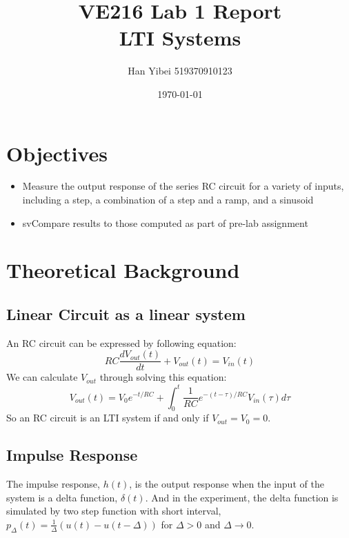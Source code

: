 \documentclass[a4paper]{article}
\title{\textbf{VE216 Lab 1 Report\\LTI Systems}}
\author{
    \Large Han Yibei
    \normalsize 519370910123
}
\date{\today}
\begin{document}
    \maketitle
    \tableofcontents
    \newpage




    \section{Objectives}
    \begin{itemize}
        \item Measure the output response of the series RC circuit for a variety of inputs, including a step, a
        combination of a step and a ramp, and a sinusoid
        \item svCompare results to those computed as part of pre-lab assignment
    \end{itemize}






    \section{Theoretical Background}
    \subsection{Linear Circuit as a linear system}
    An RC circuit can be expressed by following equation:
    \begin{equation}
        RC\frac{dV_{out}(t)}{dt} + V_{out}(t) = V_{in}(t)    
    \end{equation}
    We can calculate $V_{out}$ through solving this equation:
    \begin{equation}
        V_{out}(t) = V_0e^{-t/RC} + \int_0^t \frac{1}{RC}e^{-(t-\tau)/RC}V_{in}(\tau)d\tau
    \end{equation}
   So an RC circuit is an LTI system if and only if $V_{out}=V_0=0$. 

    \subsection{Impulse Response}
    The impulse response, $h(t)$, is the output response when the input of the system is a delta function, $\delta(t)$. And in the experiment, the delta function is simulated by two step function with short interval, $p_\Delta(t) = \frac{1}{\Delta}(u(t)-u(t-\Delta))$ for $\Delta > 0$ and $\Delta \rightarrow 0$.
\end{document}
